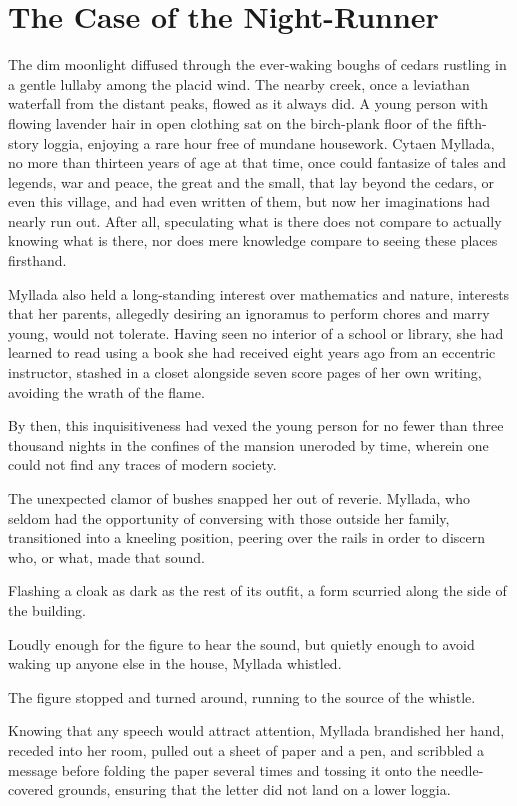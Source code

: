 

\chapter{The Case of the Night-Runner}

The dim moonlight diffused through the ever-waking boughs of cedars rustling in a gentle lullaby among the placid wind.  The nearby creek, once a leviathan waterfall from the distant peaks, flowed as it always did. A young person with flowing lavender hair in open clothing sat on the birch-plank floor of the fifth-story loggia, enjoying a rare hour free of mundane housework. Cytaen Myllada, no more than thirteen years of age at that time, once could fantasize of tales and legends, war and peace, the great and the small, that lay beyond the cedars, or even this village, and had even written of them, but now her imaginations had nearly run out. After all, speculating what is there does not compare to actually knowing what is there, nor does mere knowledge compare to seeing these places firsthand.

Myllada also held a long-standing interest over mathematics and nature, interests that her parents, allegedly desiring an ignoramus to perform chores and marry young, would not tolerate. Having seen no interior of a school or library, she had learned to read using a book she had received eight years ago from an eccentric instructor, stashed in a closet alongside seven score pages of her own writing, avoiding the wrath of the flame.

By then, this inquisitiveness had vexed the young person for no fewer than three thousand nights in the confines of the mansion uneroded by time, wherein one could not find any traces of modern society.

The unexpected clamor of bushes snapped her out of reverie. Myllada, who seldom had the opportunity of conversing with those outside her family, transitioned into a kneeling position, peering over the rails in order to discern who, or what, made that sound.

Flashing a cloak as dark as the rest of its outfit, a form scurried along the side of the building.

Loudly enough for the figure to hear the sound, but quietly enough to avoid waking up anyone else in the house, Myllada whistled.

The figure stopped and turned around, running to the source of the whistle.

Knowing that any speech would attract attention, Myllada brandished her hand, receded into her room, pulled out a sheet of paper and a pen, and scribbled a message before folding the paper several times and tossing it onto the needle-covered grounds, ensuring that the letter did not land on a lower loggia.

